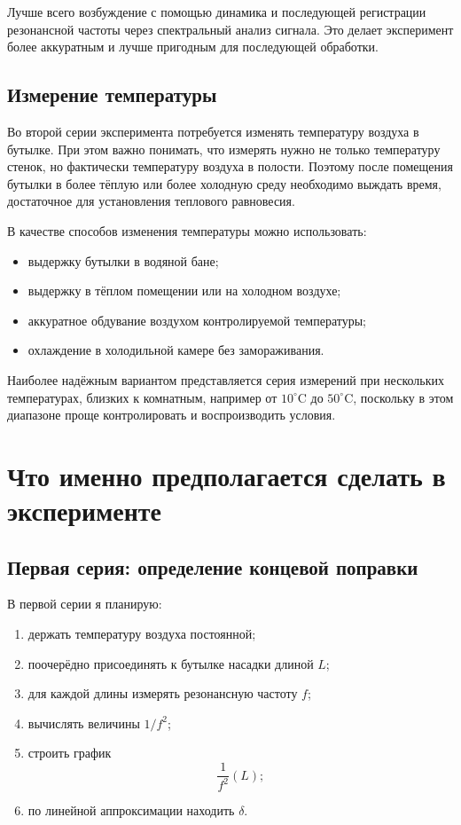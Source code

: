 \documentclass[a4paper,12pt]{article}
\begin{document}
	Лучше всего возбуждение с помощью динамика и последующей регистрации резонансной частоты через спектральный анализ сигнала. Это делает эксперимент более аккуратным и лучше пригодным для последующей обработки.
	
	\subsection{Измерение температуры}
	
	Во второй серии эксперимента потребуется изменять температуру воздуха в бутылке. При этом важно понимать, что измерять нужно не только температуру стенок, но фактически температуру воздуха в полости. Поэтому после помещения бутылки в более тёплую или более холодную среду необходимо выждать время, достаточное для установления теплового равновесия.
	
	В качестве способов изменения температуры можно использовать:
	\begin{itemize}
		\item выдержку бутылки в водяной бане;
		\item выдержку в тёплом помещении или на холодном воздухе;
		\item аккуратное обдувание воздухом контролируемой температуры;
		\item охлаждение в холодильной камере без замораживания.
	\end{itemize}
	
	Наиболее надёжным вариантом представляется серия измерений при нескольких температурах, близких к комнатным, например от \(10^\circ\mathrm{C}\) до \(50^\circ\mathrm{C}\), поскольку в этом диапазоне проще контролировать и воспроизводить условия.
	
	\section{Что именно предполагается сделать в эксперименте}
	
	\subsection{Первая серия: определение концевой поправки}
	
	В первой серии я планирую:
	\begin{enumerate}[label=\arabic*)]
		\item держать температуру воздуха постоянной;
		\item поочерёдно присоединять к бутылке насадки длиной \(L\);
		\item для каждой длины измерять резонансную частоту \(f\);
		\item вычислять величины \(1/f^2\);
		\item строить график
		\[
		\frac{1}{f^2}(L);
		\]
		\item по линейной аппроксимации находить \(\delta\).
	\end{enumerate}
	
\end{document}
